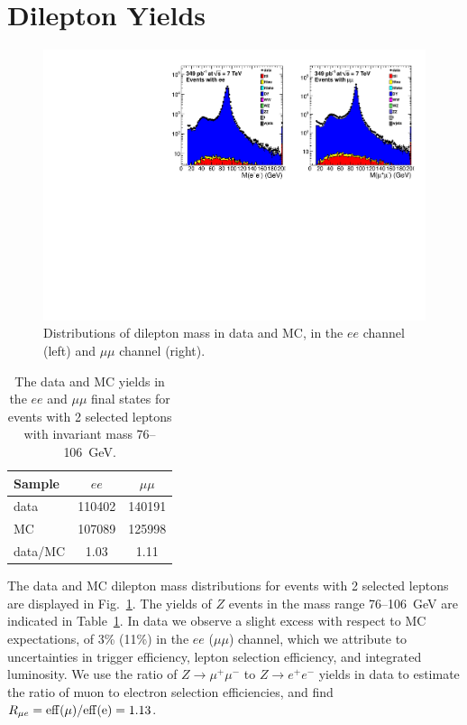 \section{Dilepton Yields}

\begin{figure}[tbh]
\begin{center}
\includegraphics[width=1.0\linewidth]{plots/dilmass_349pb.pdf}
\caption{\label{fig:Z}\protect Distributions of dilepton mass in data and MC,
in the $ee$ channel (left) and $\mu\mu$ channel (right). 
}
\end{center}
\end{figure}


\begin{table}[htb]
\begin{center}
\caption{\label{tab:lepyields}
The data and MC yields in the $ee$ and $\mu\mu$ final states for events with 2 selected
leptons with invariant mass 76--106~GeV.
}
\begin{tabular}{l|cc}
\hline
         Sample   &           $ee$   &       $\mu\mu$   \\
\hline
data              &         110402   &         140191   \\
MC                &         107089   &         125998   \\
\hline
data/MC           &           1.03   &           1.11   \\
\hline
\end{tabular}
\end{center}
\end{table}

The data and MC dilepton mass distributions for events with 2 selected leptons are displayed in Fig.~\ref{fig:Z}.
The yields of $Z$ events in the mass range 76--106~GeV are indicated in Table~\ref{tab:lepyields}. 
In data we observe a slight excess with respect to MC expectations, of 3\% (11\%) in the $ee$ ($\mu\mu$) channel,
which we attribute to uncertainties in trigger efficiency, lepton selection efficiency, and integrated
luminosity. We use the ratio of $Z \to \mu^+\mu^-$ to $Z \to e^+e^-$ yields in data to estimate the
ratio of muon to electron selection efficiencies, and find $R_{\mu e} = \rm{eff}(\mu)/\rm{eff}(e) = 1.13$.

